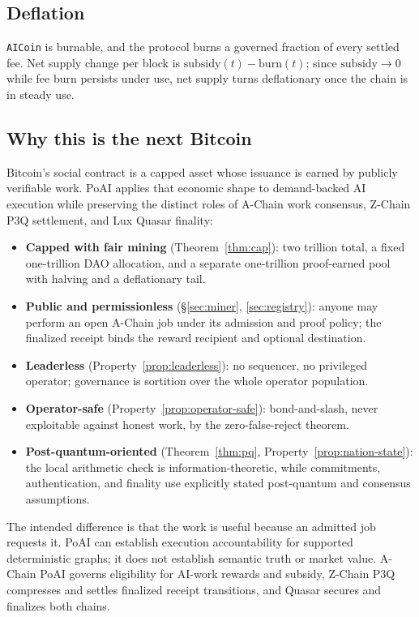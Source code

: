 \documentclass[11pt,a4paper]{article}
\begin{document}
\subsection{Deflation}

\texttt{AICoin} is burnable, and the protocol burns a governed fraction of every settled fee. Net supply change per block is $\text{subsidy}(t) - \text{burn}(t)$; since $\text{subsidy} \to 0$ while fee burn persists under use, net supply turns deflationary once the chain is in steady use.

\subsection{Why this is the next Bitcoin}

Bitcoin's social contract is a capped asset whose issuance is earned by publicly verifiable work. PoAI applies that economic shape to demand-backed AI execution while preserving the distinct roles of A-Chain work consensus, Z-Chain P3Q settlement, and Lux Quasar finality:
\begin{itemize}
  \item \textbf{Capped with fair mining} (Theorem~\ref{thm:cap}): two trillion total, a fixed one-trillion DAO allocation, and a separate one-trillion proof-earned pool with halving and a deflationary tail.
  \item \textbf{Public and permissionless} (\S\ref{sec:miner}, \ref{sec:registry}): anyone may perform an open A-Chain job under its admission and proof policy; the finalized receipt binds the reward recipient and optional destination.
  \item \textbf{Leaderless} (Property~\ref{prop:leaderless}): no sequencer, no privileged operator; governance is sortition over the whole operator population.
  \item \textbf{Operator-safe} (Property~\ref{prop:operator-safe}): bond-and-slash, never exploitable against honest work, by the zero-false-reject theorem.
  \item \textbf{Post-quantum-oriented} (Theorem~\ref{thm:pq}, Property~\ref{prop:nation-state}): the local arithmetic check is information-theoretic, while commitments, authentication, and finality use explicitly stated post-quantum and consensus assumptions.
\end{itemize}
The intended difference is that the work is useful because an admitted job requests it. PoAI can establish execution accountability for supported deterministic graphs; it does not establish semantic truth or market value. A-Chain PoAI governs eligibility for AI-work rewards and subsidy, Z-Chain P3Q compresses and settles finalized receipt transitions, and Quasar secures and finalizes both chains.
\end{document}
